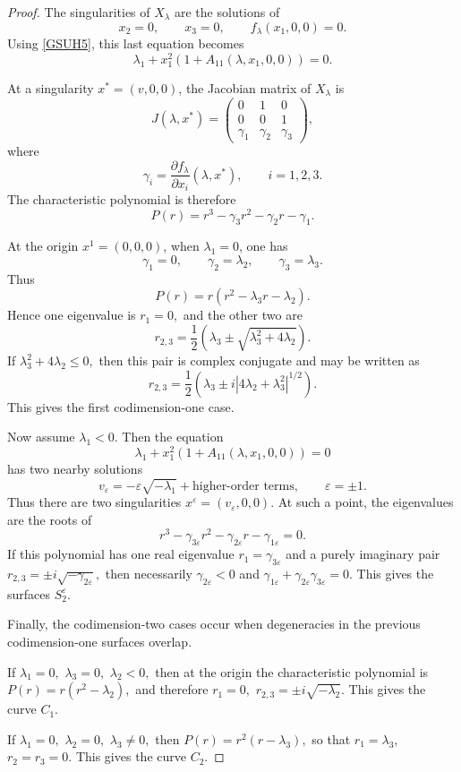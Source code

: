 \documentclass[12pt]{article}
\newtheorem{remark definition}{Remark Definition}[section]
\begin{document}
\begin{proof}
	The singularities of $X_\lambda$ are the solutions of
	$$
	x_2=0,
	\qquad
	x_3=0,
	\qquad
	f_\lambda(x_1,0,0)=0.
	$$
	Using \eqref{GSUH5}, this last equation becomes
	$$
	\lambda_1
	+
	x_1^2
	\left(
	1+A_{11}(\lambda,x_1,0,0)
	\right)
	=0.
	$$
	
	At a singularity $x^\ast=(v,0,0)$, the Jacobian matrix of $X_\lambda$ is
	$$
	J(\lambda,x^\ast)
	=
	\begin{pmatrix}
		0 & 1 & 0\\
		0 & 0 & 1\\
		\gamma_1 & \gamma_2 & \gamma_3
	\end{pmatrix},
	$$
	where
	$$
	\gamma_i
	=
	\frac{\partial f_\lambda}{\partial x_i}
	(\lambda,x^\ast),
	\qquad
	i=1,2,3.
	$$
	The characteristic polynomial is therefore
	$$
	P(r)
	=
	r^3-\gamma_3r^2-\gamma_2r-\gamma_1.
	$$
	
	At the origin $x^1=(0,0,0)$, when $\lambda_1=0$, one has
	$$
	\gamma_1=0,
	\qquad
	\gamma_2=\lambda_2,
	\qquad
	\gamma_3=\lambda_3.
	$$
	Thus
	$$
	P(r)
	=
	r(r^2-\lambda_3r-\lambda_2).
	$$
	Hence one eigenvalue is $r_1=0,$
	and the other two are
	$$
	r_{2,3}
	=
	\frac{1}{2}
	\left(
	\lambda_3
	\pm
	\sqrt{\lambda_3^2+4\lambda_2}
	\right).
	$$
	If $\lambda_3^2+4\lambda_2\leq 0,$
	then this pair is complex conjugate and may be written as
	$$
	r_{2,3}
	=
	\frac{1}{2}
	\left(
	\lambda_3
	\pm
	i\left|4\lambda_2+\lambda_3^2\right|^{1/2}
	\right).
	$$
	This gives the first codimension-one case.
	
	Now assume $\lambda_1<0$. Then the equation
	$$
	\lambda_1
	+
	x_1^2
	\left(
	1+A_{11}(\lambda,x_1,0,0)
	\right)
	=0
	$$
	has two nearby solutions
	$$
	v_\varepsilon
	=
	-\varepsilon\sqrt{-\lambda_1}
	+
	\text{higher-order terms},
	\qquad
	\varepsilon=\pm 1.
	$$
	Thus there are two singularities $x^\varepsilon=(v_\varepsilon,0,0).$
	At such a point, the eigenvalues are the roots of
	$$
	r^3-\gamma_{3\varepsilon}r^2
	-\gamma_{2\varepsilon}r
	-\gamma_{1\varepsilon}
	=0.
	$$
	If this polynomial has one real eigenvalue $r_1=\gamma_{3\varepsilon}$
	and a purely imaginary pair $r_{2,3}=\pm i\sqrt{-\gamma_{2\varepsilon}},$
	then necessarily $\gamma_{2\varepsilon}<0$
	and $\gamma_{1\varepsilon}+\gamma_{2\varepsilon}\gamma_{3\varepsilon}=0.$
	This gives the surfaces $S_2^\varepsilon$.
	
	Finally, the codimension-two cases occur when degeneracies in the previous
	codimension-one surfaces overlap.
	
	If $\lambda_1=0,$ $\lambda_3=0,$ $\lambda_2<0,$
	then at the origin the characteristic polynomial is $
	P(r)=r(r^2-\lambda_2),$
	and therefore $r_1=0,$ $r_{2,3}=\pm i\sqrt{-\lambda_2}.$
	This gives the curve $C_1$.
	
	If $\lambda_1=0,$ $\lambda_2=0,$ $\lambda_3\neq 0,$
	then $P(r)=r^2(r-\lambda_3),$
	so that $r_1=\lambda_3,$ $r_2=r_3=0.$
	This gives the curve $C_2$.
\end{proof}
\end{document}
